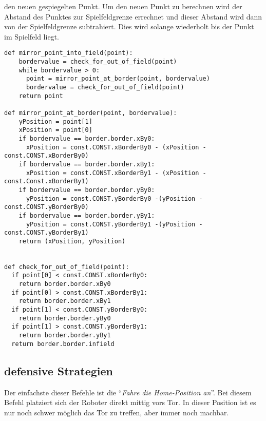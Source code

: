 den neuen gespiegelten Punkt. Um den neuen Punkt zu berechnen wird der Abstand des Punktes zur Spielfeldgrenze errechnet und dieser Abstand wird dann von der Spielfeldgrenze subtrahiert. Dies wird solange wiederholt bis der Punkt im Spielfeld liegt.
\begin{lstlisting}[caption= Python-Funktion für Punktspiegelung, label=lst:Punktspiegelung]
def mirror_point_into_field(point):
    bordervalue = check_for_out_of_field(point)
    while bordervalue > 0:
	  point = mirror_point_at_border(point, bordervalue)
	  bordervalue = check_for_out_of_field(point)
    return point
   
def mirror_point_at_border(point, bordervalue):
    yPosition = point[1] 
    xPosition = point[0]
    if bordervalue == border.border.xBy0:
      xPosition = const.CONST.xBorderBy0 - (xPosition - const.CONST.xBorderBy0)
    if bordervalue == border.border.xBy1:
	  xPosition = const.CONST.xBorderBy1 - (xPosition - const.Const.xBorderBy1)
    if bordervalue == border.border.yBy0:
      yPosition = const.CONST.yBorderBy0 -(yPosition - const.CONST.yBorderBy0)
    if bordervalue == border.border.yBy1:
      yPosition = const.CONST.yBorderBy1 -(yPosition - const.CONST.yBorderBy1)
    return (xPosition, yPosition)
   
   
def check_for_out_of_field(point):
  if point[0] < const.CONST.xBorderBy0:
    return border.border.xBy0
  if point[0] > const.CONST.xBorderBy1:
    return border.border.xBy1
  if point[1] < const.CONST.yBorderBy0:
    return border.border.yBy0
  if point[1] > const.CONST.yBorderBy1:
    return border.border.yBy1
  return border.border.infield 
\end{lstlisting}



\subsection{defensive Strategien}
Der einfachste dieser Befehle ist die \enquote{\textit{Fahre die Home-Position an}}. Bei diesem Befehl platziert sich der Roboter direkt mittig vors Tor. In dieser Position ist es nur noch schwer möglich das Tor zu treffen, aber immer noch machbar. 

